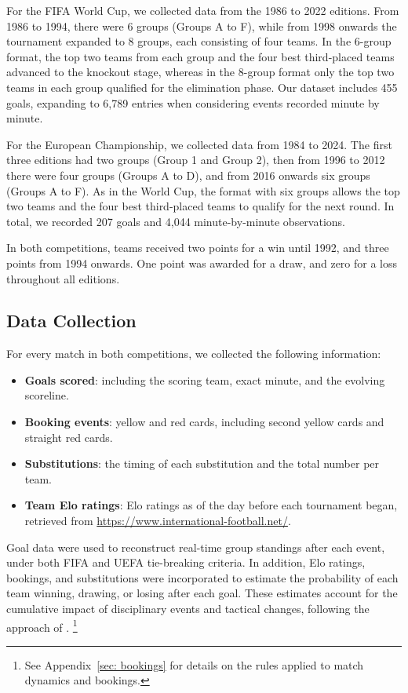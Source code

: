 \documentclass[11pt]{article}
\begin{document}
For the FIFA World Cup, we collected data from the 1986 to 2022 editions. From 1986 to 1994, there were 6 groups (Groups A to F), while from 1998 onwards the tournament expanded to 8 groups, each consisting of four teams. In the 6-group format, the top two teams from each group and the four best third-placed teams advanced to the knockout stage, whereas in the 8-group format only the top two teams in each group qualified for the elimination phase. Our dataset includes 455 goals, expanding to 6,789 entries when considering events recorded minute by minute.

For the European Championship, we collected data from 1984 to 2024. The first three editions had two groups (Group 1 and Group 2), then from 1996 to 2012 there were four groups (Groups A to D), and from 2016 onwards six groups (Groups A to F). As in the World Cup, the format with six groups allows the top two teams and the four best third-placed teams to qualify for the next round. In total, we recorded 207 goals and 4,044 minute-by-minute observations.

In both competitions, teams received two points for a win until 1992, and three points from 1994 onwards. One point was awarded for a draw, and zero for a loss throughout all editions.


\subsection{Data Collection}

For every match in both competitions, we collected the following information:

\begin{itemize}
    \item \textbf{Goals scored}: including the scoring team, exact minute, and the evolving scoreline.
    \item \textbf{Booking events}: yellow and red cards, including second yellow cards and straight red cards.
    \item \textbf{Substitutions}: the timing of each substitution and the total number per team.
    \item \textbf{Team Elo ratings}: Elo ratings as of the day before each tournament began, retrieved from \url{https://www.international-football.net/}.
\end{itemize}

Goal data were used to reconstruct real-time group standings after each event, under both FIFA and UEFA tie-breaking criteria. In addition, Elo ratings, bookings, and substitutions were incorporated to estimate the probability of each team winning, drawing, or losing after each goal. These estimates account for the cumulative impact of disciplinary events and tactical changes, following the approach of \citet{titman2015joint}.
\footnote{See Appendix~\ref{sec: bookings} for details on the rules applied to match dynamics and bookings.}
\end{document}
